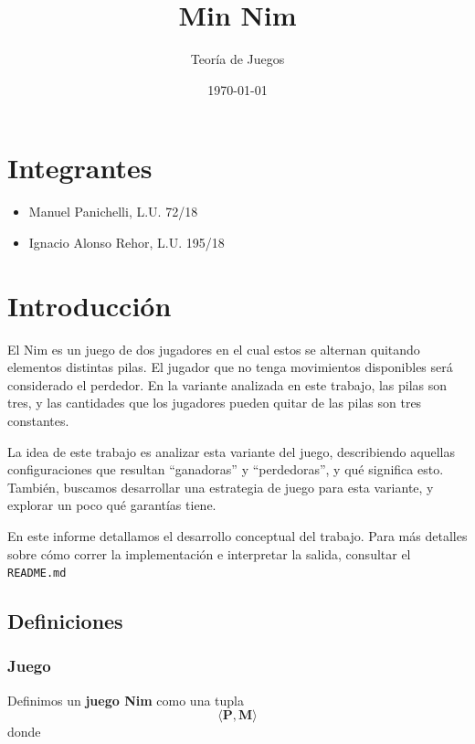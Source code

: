 \documentclass{article}
\title{Min Nim}
\author{Teoría de Juegos}
\date{\today}
\newcommand{\nimTuple}[2]{\langle #1, #2\rangle}
\newcommand{\pos}{\mathbf{P}}
\newcommand{\moves}{\mathbf{M}}
\begin{document}
\maketitle

\section*{Integrantes}

\begin{itemize}
    \item Manuel Panichelli, L.U. 72/18
    \item Ignacio Alonso Rehor, L.U. 195/18
\end{itemize}

\section*{Introducción}

El Nim es un juego de dos jugadores en el cual estos se alternan quitando elementos distintas pilas. El jugador que no tenga movimientos disponibles será considerado el perdedor. En la variante analizada en este trabajo, las pilas son tres, y las cantidades que los jugadores pueden quitar de las pilas son tres constantes.

La idea de este trabajo es analizar esta variante del juego, describiendo aquellas configuraciones que resultan ``ganadoras'' y ``perdedoras'', y qué significa esto. También, buscamos desarrollar una estrategia de juego para esta variante, y explorar un poco qué garantías tiene. 

\begin{tcolorbox}[colback=red!5!white,colframe=red!75!black]
    En este informe detallamos el desarrollo conceptual del trabajo. Para más detalles sobre cómo correr la implementación e interpretar la salida, consultar el \texttt{README.md}
\end{tcolorbox}

\subsection*{Definiciones}

\subsubsection*{Juego}

Definimos un \textbf{juego Nim} como una tupla
\[
    \nimTuple{\pos}{\moves}
\]
donde
\end{document}
